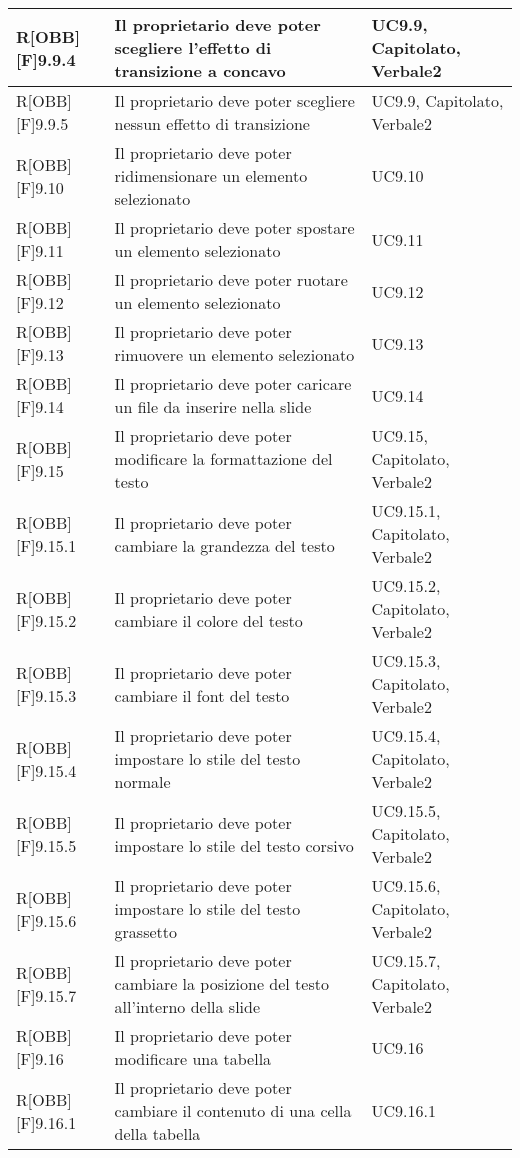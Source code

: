	\begin{table}[h]
		\begin{tabular}{|p{}|p{}|p{}|}
			\midrule

			R[OBB][F]9.9.4 & Il proprietario deve poter scegliere l'effetto di transizione a concavo & UC9.9, Capitolato, Verbale2 \\ \midrule
			R[OBB][F]9.9.5 & Il proprietario deve poter scegliere nessun effetto di transizione & UC9.9, Capitolato, Verbale2 \\ \midrule
			R[OBB][F]9.10 & Il proprietario deve poter ridimensionare un elemento selezionato & UC9.10 \\ \midrule
			R[OBB][F]9.11 & Il proprietario deve poter spostare un elemento selezionato & UC9.11 \\ \midrule
			R[OBB][F]9.12 & Il proprietario deve poter ruotare un elemento selezionato & UC9.12 \\ \midrule
			R[OBB][F]9.13 & Il proprietario deve poter rimuovere un elemento selezionato & UC9.13 \\ \midrule
			R[OBB][F]9.14 & Il proprietario deve poter caricare un file da inserire nella \gls{slide} & UC9.14 \\ \midrule
			R[OBB][F]9.15 & Il proprietario deve poter modificare la formattazione del testo & UC9.15, Capitolato, Verbale2 \\ \midrule
			R[OBB][F]9.15.1 & Il proprietario deve poter cambiare la grandezza del testo & UC9.15.1, Capitolato, Verbale2 \\ \midrule
			R[OBB][F]9.15.2 & Il proprietario deve poter cambiare il colore del testo & UC9.15.2, Capitolato, Verbale2 \\ \midrule
			R[OBB][F]9.15.3 & Il proprietario deve poter cambiare il \gls{font} del testo & UC9.15.3, Capitolato, Verbale2 \\ \midrule
			R[OBB][F]9.15.4 & Il proprietario deve poter impostare lo stile del testo normale & UC9.15.4, Capitolato, Verbale2 \\ \midrule
			R[OBB][F]9.15.5 & Il proprietario deve poter impostare lo stile del testo corsivo & UC9.15.5, Capitolato, Verbale2 \\ \midrule
			R[OBB][F]9.15.6 & Il proprietario deve poter impostare lo stile del testo grassetto & UC9.15.6, Capitolato, Verbale2 \\ \midrule
			R[OBB][F]9.15.7 & Il proprietario deve poter cambiare la posizione del testo all'interno della \gls{slide} & UC9.15.7, Capitolato, Verbale2 \\ \midrule
			R[OBB][F]9.16 & Il proprietario deve poter modificare una tabella & UC9.16 \\ \midrule
			R[OBB][F]9.16.1 & Il proprietario deve poter cambiare il contenuto di una cella della tabella & UC9.16.1 \\ \midrule

		\end{tabular}
	\end{table}
	\newpage

